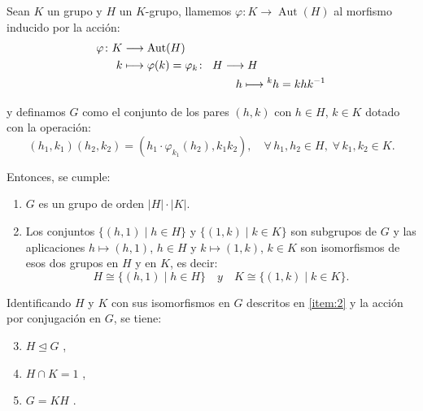 \begin{theorem} \label{grande}

Sean $K$ un grupo y $H$ un $K$-grupo, llamemos $\varphi \colon K \rightarrow \operatorname{Aut}(H)$ al morfismo inducido por la acción:
\begin{align*}
    \varphi \colon K &\longrightarrow \operatorname{Aut}(H) \\
    k  &\longmapsto \varphi(k) = \varphi_k   \colon \; \; H\longrightarrow H \\
        & \hspace{3.5cm}   h \longmapsto {}^kh = khk^{-1} 
\end{align*}

y definamos $G$ como el conjunto de los pares $(h,k)$ con $h\in H$, $k \in K$ dotado con la operación:
\[
    (h_1,k_1)(h_2,k_2) = (h_1 \cdot \varphi_{k_1}(h_2), k_1k_2), \quad \forall \, h_1,h_2 \in H, \; \forall \, k_1,k_2 \in K.
\]


Entonces, se cumple:
\begin{enumerate}[label=\arabic*.]
    \item $G$ es un grupo de orden $|H|\cdot|K|$. \label{item:1}
    
    \item Los conjuntos $\{(h,1) \mid h \in H\}$ y $\{(1,k) \mid k \in K\}$ son subgrupos de $G$ y las aplicaciones $h \mapsto (h,1)$, $h\in H$ y $k\mapsto (1,k)$, $k \in K$ son isomorfismos de esos dos grupos en $H$ y en $K$, es decir:
    \[
        H \cong \{(h,1) \mid h \in H\} \quad y \quad 
        K \cong \{(1,k) \mid k \in K\}.
    \]
     \label{item:2}
\end{enumerate} 
    Identificando $H$ y $K$ con sus isomorfismos en $G$ descritos en \ref{item:2} y la acción por conjugación en $G$, se tiene:
\begin{enumerate}[label=\arabic*.]
    \setcounter{enumi}{2}
    \item $H \trianglelefteq G$  , \label{item:3}
    \item $H \cap K =1$ , \label{item:4}
    \item $G = KH$ .\label{item:5}
    \end{enumerate}
\end{theorem}



